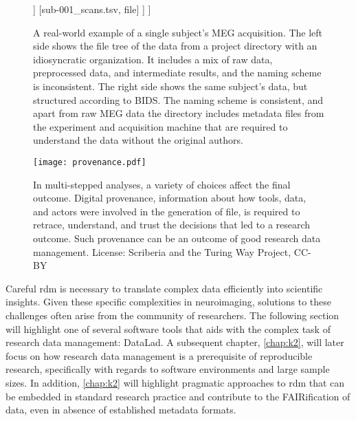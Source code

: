 \begin{figure}
{\begin{minipage}{.49\textwidth}
\begin{forest}
				]
				[sub-001\_scans.tsv, file]
				]
				]
			\end{forest}
		\end{minipage}
	}
	\caption[An example of BIDS]{A real-world example of a single subject's MEG acquisition. The left side shows the file tree of the data from a project directory with an idiosyncratic organization. It includes a mix of raw data, preprocessed data, and intermediate results, and the naming scheme is inconsistent. The right side shows the same subject's data, but structured according to \gls{BIDS}. The naming scheme is consistent, and apart from raw MEG data the directory includes metadata files from the experiment and acquisition machine that are required to understand the data without the original authors.}
	\label{fig:BIDS}
\end{figure}


\begin{figure}
	\centering
	\texttt{[image: provenance.pdf]}
	\caption[Provenance throughout the research process]{In multi-stepped analyses, a variety of choices affect the final outcome. Digital provenance, information about how tools, data, and actors were involved in the generation of file, is required to retrace, understand, and trust the decisions that led to a research outcome. Such provenance can be an outcome of good research data management. License: Scriberia and the Turing Way Project, CC-BY}
	\label{fig:prov1}
\end{figure}



Careful \gls{rdm} is necessary to translate complex data efficiently into scientific insights.
Given these specific complexities in neuroimaging, solutions to these challenges often arise from the community of researchers.
The following section will highlight one of several software tools that aids with the complex task of research data management: DataLad.
A subsequent chapter, \cref{chap:k2}, will later focus on how research data management is a prerequisite of reproducible research, specifically with regards to software environments and large sample sizes.
In addition, \cref{chap:k2} will highlight pragmatic approaches to \gls{rdm} that can be embedded in standard research practice and contribute to the FAIRification of data, even in absence of established metadata formats.



